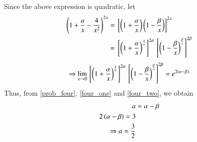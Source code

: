Since the above expression is quadratic, let 
%
\begin{align}
\label{four_one}
\left(1 + \frac{a}{x} - \frac{4}{x^2}\right)^{2x} &= {}\left[\left(1+\frac{\alpha}{ x}\right)\left(1-\frac{\beta}{ x}\right)\right]^{2x} \\
&={}\left[\left(1+\frac{\alpha}{ x}\right)^{\frac{x}{\alpha}}\right]^{2\alpha}{}\left[\left(1-\frac{\beta}{ x}\right)^{\frac{\beta}{x}}\right]^{2\beta} 
\end{align}
\begin{align}
\label{four_two}
\Rightarrow \lim_{x \rightarrow 0}{}\left[\left(1+\frac{\alpha}{ x}\right)^{\frac{x}{\alpha}}\right]^{2\alpha}{}\left[\left(1-\frac{\beta}{ x}\right)^{\frac{\beta}{x}}\right]^{2\beta} = e^{2\left(\alpha-\beta\right)}
\end{align}
%
Thus, from \eqref{prob_four}, \eqref{four_one} and \eqref{four_two}, we obtain
%
\begin{align}
a &= \alpha -\beta
\\
2\left(\alpha - \beta\right) = 3 
\\
\Rightarrow a = \frac{3}{2}
\end{align}
%
